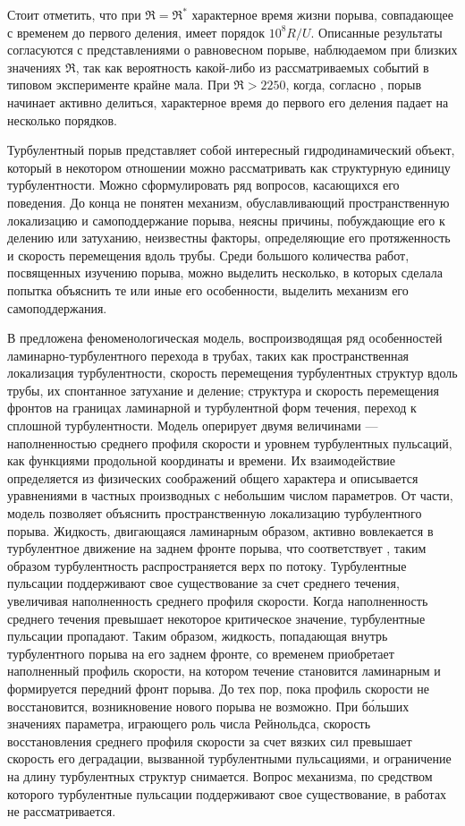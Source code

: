 Стоит отметить, что при $\Re = \Re^*$ характерное время жизни порыва, совпадающее с временем до первого деления, имеет порядок $10^8 R/U$. Описанные результаты согласуются с представлениями о равновесном порыве, наблюдаемом при близких значениях $\Re$, так как вероятность какой-либо из рассматриваемых событий в типовом эксперименте крайне мала. При $\Re > 2250$, когда, согласно \cite{Moxey2010}, порыв начинает активно делиться, характерное время до первого его деления падает на несколько порядков. 

Турбулентный порыв представляет собой интересный гидродинамический объект, который в некотором отношении можно рассматривать как структурную единицу турбулентности. Можно сформулировать ряд вопросов, касающихся его поведения. До конца не понятен механизм, обуславливающий пространственную локализацию и самоподдержание порыва, неясны причины, побуждающие его к делению или затуханию, неизвестны факторы, определяющие его протяженность и скорость перемещения вдоль трубы. Среди большого количества работ, посвященных изучению порыва, можно выделить несколько, в которых сделала попытка объяснить те или иные его особенности, выделить механизм его самоподдержания. 

В \cite{Barkley2015, Barkley2016} предложена феноменологическая модель, воспроизводящая ряд особенностей ламинарно-турбулентного перехода в трубах, таких как пространственная локализация турбулентности, скорость перемещения турбулентных структур вдоль трубы, их спонтанное затухание и деление; структура и скорость перемещения фронтов на границах ламинарной и турбулентной форм течения, переход к сплошной турбулентности. Модель оперирует двумя величинами --- наполненностью среднего профиля скорости и уровнем турбулентных пульсаций, как функциями продольной координаты и времени. Их взаимодействие определяется из физических соображений общего характера и описывается уравнениями в частных производных с небольшим числом параметров. От части, модель позволяет объяснить пространственную локализацию турбулентного порыва. Жидкость, двигающаяся ламинарным образом, активно вовлекается в турбулентное движение на заднем фронте порыва, что соответствует \cite{Song2017}, таким образом турбулентность распространяется верх по потоку. Турбулентные пульсации поддерживают свое существование за счет среднего течения, увеличивая наполненность среднего профиля скорости. Когда наполненность среднего течения превышает некоторое критическое значение, турбулентные пульсации пропадают. Таким образом, жидкость, попадающая внутрь турбулентного порыва на его заднем фронте, со временем приобретает наполненный профиль скорости, на котором течение становится ламинарным и формируется передний фронт порыва. До тех пор, пока профиль скорости не восстановится, возникновение нового порыва не возможно. При б\'{о}льших значениях параметра, играющего роль числа Рейнольдса, скорость восстановления среднего профиля скорости за счет вязких сил превышает скорость его деградации, вызванной турбулентными пульсациями, и ограничение на длину турбулентных структур снимается. Вопрос механизма, по средством которого турбулентные пульсации поддерживают свое существование, в работах \cite{Barkley2015, Barkley2016} не рассматривается.

